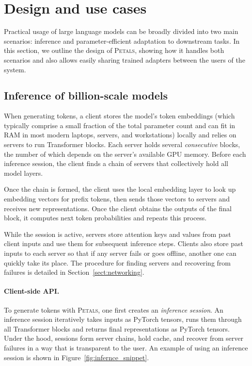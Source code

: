 \section{Design and use cases}

Practical usage of large language models can be broadly divided into two main scenarios: inference and parameter-efficient adaptation to downstream tasks. In this section, we outline the design of \textsc{Petals}, showing how it handles both scenarios and also allows easily sharing trained adapters between the users of the system.

\subsection{Inference of billion-scale models}\label{sect:design_inference}

When generating tokens, a client stores the model's token embeddings (which typically comprise a small fraction of the total parameter count and can fit in RAM in most modern laptops, servers, and workstations) locally and relies on servers to run Transformer blocks. Each server holds several \textit{consecutive} blocks, the number of which depends on the server's available GPU memory.
Before each inference session, the client finds a chain of servers that collectively hold all model layers.

Once the chain is formed, the client uses the local embedding layer to look up embedding vectors for prefix tokens, then sends those vectors to servers and receives new representations. Once the client obtains the outputs of the final block, it computes next token probabilities and repeats this process.

While the session is active, servers store attention keys and values from past client inputs and use them for subsequent inference steps. Clients also store past inputs to each server so that if any server fails or goes offline, another one can quickly take its place. The procedure for finding servers and recovering from failures is detailed in Section~\ref{sect:networking}.

\paragraph{Client-side API.} To generate tokens with \textsc{Petals}, one first creates an \textit{inference session}. An inference session iteratively takes inputs as PyTorch tensors, runs them through all Transformer blocks and returns final representations as PyTorch tensors. Under the hood, sessions form server chains, hold cache, and recover from server failures in a way that is transparent to the user. An example of using an inference session is shown in Figure~\ref{fig:infernce_snippet}.

